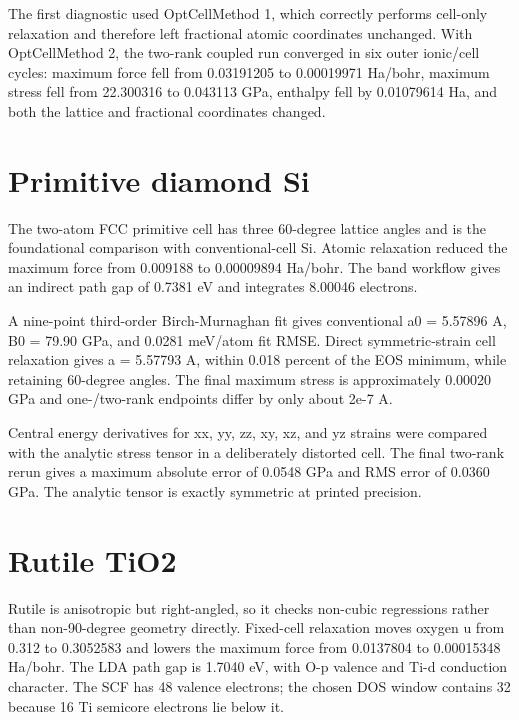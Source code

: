 \documentclass[10pt,a4paper]{report}
\begin{document}
The first diagnostic used OptCellMethod 1, which correctly performs cell-only relaxation and therefore left fractional atomic coordinates unchanged. With OptCellMethod 2, the two-rank coupled run converged in six outer ionic/cell cycles: maximum force fell from 0.03191205 to 0.00019971 Ha/bohr, maximum stress fell from 22.300316 to 0.043113 GPa, enthalpy fell by 0.01079614 Ha, and both the lattice and fractional coordinates changed.

\section{Primitive diamond Si}
The two-atom FCC primitive cell has three 60-degree lattice angles and is the foundational comparison with conventional-cell Si. Atomic relaxation reduced the maximum force from 0.009188 to 0.00009894 Ha/bohr. The band workflow gives an indirect path gap of 0.7381 eV and integrates 8.00046 electrons.

A nine-point third-order Birch-Murnaghan fit gives conventional a0 = 5.57896 A, B0 = 79.90 GPa, and 0.0281 meV/atom fit RMSE. Direct symmetric-strain cell relaxation gives a = 5.57793 A, within 0.018 percent of the EOS minimum, while retaining 60-degree angles. The final maximum stress is approximately 0.00020 GPa and one-/two-rank endpoints differ by only about 2e-7 A.

Central energy derivatives for xx, yy, zz, xy, xz, and yz strains were compared with the analytic stress tensor in a deliberately distorted cell. The final two-rank rerun gives a maximum absolute error of 0.0548 GPa and RMS error of 0.0360 GPa. The analytic tensor is exactly symmetric at printed precision.

\section{Rutile TiO2}
Rutile is anisotropic but right-angled, so it checks non-cubic regressions rather than non-90-degree geometry directly. Fixed-cell relaxation moves oxygen u from 0.312 to 0.3052583 and lowers the maximum force from 0.0137804 to 0.00015348 Ha/bohr. The LDA path gap is 1.7040 eV, with O-p valence and Ti-d conduction character. The SCF has 48 valence electrons; the chosen DOS window contains 32 because 16 Ti semicore electrons lie below it.
\end{document}

